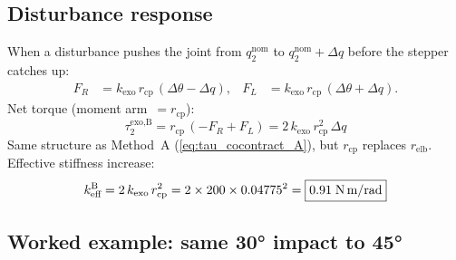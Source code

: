 \documentclass[11pt, a4paper]{article}
\begin{document}
\subsection{Disturbance response}

When a disturbance pushes the joint from $q_2^{\text{nom}}$ to
$q_2^{\text{nom}} + \Delta q$ before the stepper catches up:
%
\begin{align}
    F_R &= k_{\text{exo}}\,r_{\text{cp}}\,(\Delta\theta - \Delta q), &
    F_L &= k_{\text{exo}}\,r_{\text{cp}}\,(\Delta\theta + \Delta q).
\end{align}
%
Net torque (moment arm~$= r_{\text{cp}}$):
%
\begin{equation}\label{eq:tau_B}
    \tau_2^{\text{exo,B}}
    = r_{\text{cp}}\,(-F_R + F_L)
    = \boxed{2\,k_{\text{exo}}\,r_{\text{cp}}^2\,\Delta q}
\end{equation}
%
Same structure as Method~A (\cref{eq:tau_cocontract_A}), but
$r_{\text{cp}}$ replaces $r_{\text{elb}}$.  Effective stiffness increase:
%
\begin{equation}\label{eq:keff_B}
    k_{\text{eff}}^{\text{B}} = 2\,k_{\text{exo}}\,r_{\text{cp}}^2
    = 2 \times 200 \times 0.04775^2
    = \boxed{0.91\;\text{N\,m/rad}}
\end{equation}

\subsection{Worked example: same 30° impact to 45°}
\label{sec:example-B}
\end{document}
